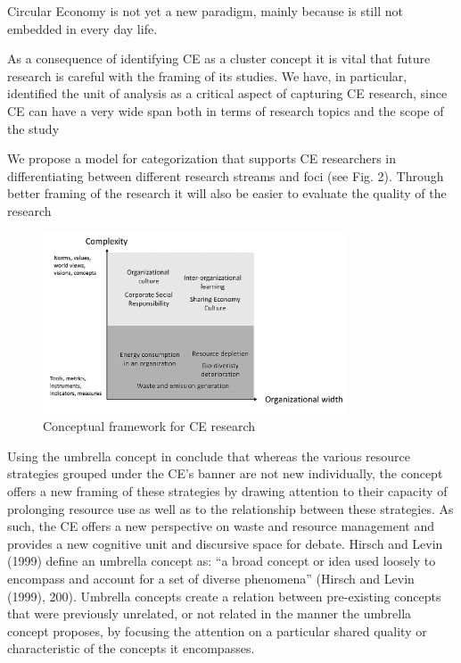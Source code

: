 Circular Economy is not yet a new paradigm, mainly because is still not embedded in every day life. 

As a consequence of identifying CE as a cluster concept it is vital that future research is careful with the framing of its studies. We have, in particular, identified the unit of analysis as a critical aspect of capturing CE research, since CE can have a very wide span both in terms of research topics and the scope of the study 

We propose a model for categorization that supports CE researchers in differentiating between different research streams and foci (see Fig. 2). Through better framing of the research it will also be easier to evaluate the quality of the research

\parencite{CDR2005}


\begin{figure}[h!]
    \centering
    \includegraphics[width=0.8\textwidth]{sections/asset/stages_in_ce.PNG}
    \caption{Conceptual framework for CE research}
    \label{fig:stages}
\end{figure}


Using the umbrella concept in \textcite{Blomsma2017} conclude that whereas the various resource strategies grouped under the CE’s banner are not new individually, the concept offers a new framing of these strategies by drawing attention to their capacity of prolonging resource use as well as to the relationship between these strategies. As such, the CE offers a new perspective on waste and resource management and provides a new cognitive unit and discursive space for debate. 
Hirsch and Levin (1999) define an umbrella concept as: “a broad concept or idea used loosely to encompass and account for a set of diverse phenomena” (Hirsch and Levin (1999), 200). Umbrella concepts create a relation between pre-existing concepts that were previously unrelated, or not related in the manner the umbrella concept proposes, by focusing the attention on a particular shared quality or characteristic of the concepts it encompasses.


